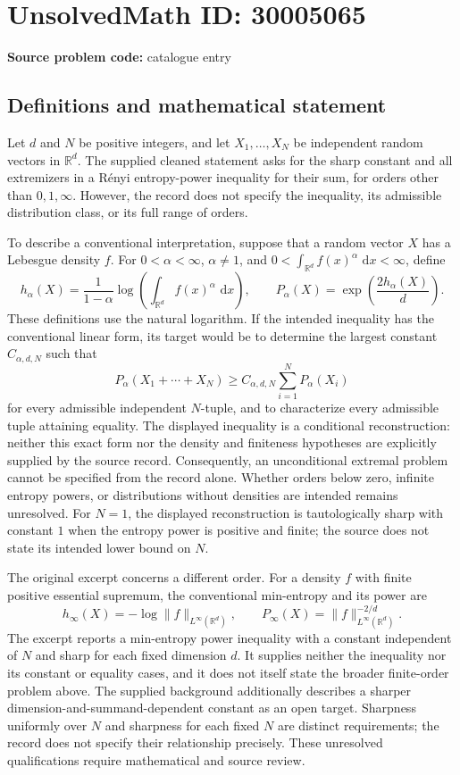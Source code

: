 \documentclass[11pt]{article}
\newcommand{\R}{\mathbb{R}}
\newcommand{\dd}{\,\mathrm{d}}
\begin{document}
\section*{UnsolvedMath ID: 30005065}
\textbf{Source problem code:} catalogue entry
\subsection{Definitions and mathematical statement}
Let \(d\) and \(N\) be positive integers, and let \(X_1,\ldots,X_N\) be independent random vectors in \(\R^d\). The supplied cleaned statement asks for the sharp constant and all extremizers in a Rényi entropy-power inequality for their sum, for orders other than \(0,1,\infty\). However, the record does not specify the inequality, its admissible distribution class, or its full range of orders.

To describe a conventional interpretation, suppose that a random vector \(X\) has a Lebesgue density \(f\). For \(0<\alpha<\infty\), \(\alpha\ne1\), and \(0<\int_{\R^d}f(x)^\alpha\,\dd x<\infty\), define
\[
h_\alpha(X)=\frac{1}{1-\alpha}\log\!\left(\int_{\R^d}f(x)^\alpha\,\dd x\right),
\qquad
P_\alpha(X)=\exp\!\left(\frac{2h_\alpha(X)}{d}\right).
\]
These definitions use the natural logarithm. If the intended inequality has the conventional linear form, its target would be to determine the largest constant \(C_{\alpha,d,N}\) such that
\[
P_\alpha(X_1+\cdots+X_N)
\ge C_{\alpha,d,N}\sum_{i=1}^{N}P_\alpha(X_i)
\]
for every admissible independent \(N\)-tuple, and to characterize every admissible tuple attaining equality. The displayed inequality is a conditional reconstruction: neither this exact form nor the density and finiteness hypotheses are explicitly supplied by the source record. Consequently, an unconditional extremal problem cannot be specified from the record alone. Whether orders below zero, infinite entropy powers, or distributions without densities are intended remains unresolved. For \(N=1\), the displayed reconstruction is tautologically sharp with constant \(1\) when the entropy power is positive and finite; the source does not state its intended lower bound on \(N\).

The original excerpt concerns a different order. For a density \(f\) with finite positive essential supremum, the conventional min-entropy and its power are
\[
h_\infty(X)=-\log\|f\|_{L^\infty(\R^d)},
\qquad
P_\infty(X)=\|f\|_{L^\infty(\R^d)}^{-2/d}.
\]
The excerpt reports a min-entropy power inequality with a constant independent of \(N\) and sharp for each fixed dimension \(d\). It supplies neither the inequality nor its constant or equality cases, and it does not itself state the broader finite-order problem above. The supplied background additionally describes a sharper dimension-and-summand-dependent constant as an open target. Sharpness uniformly over \(N\) and sharpness for each fixed \(N\) are distinct requirements; the record does not specify their relationship precisely. These unresolved qualifications require mathematical and source review.
\end{document}

